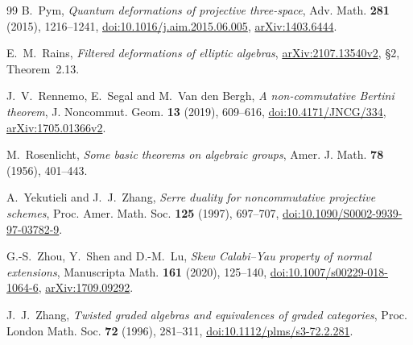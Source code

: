 \documentclass[11pt,a4paper]{ltjsarticle}
\numberwithin{equation}{section}
\begin{document}
\begin{thebibliography}{99}
B.~Pym,
\textit{Quantum deformations of projective three-space},
Adv. Math. \textbf{281} (2015), 1216--1241,
\href{https://doi.org/10.1016/j.aim.2015.06.005}{doi:10.1016/j.aim.2015.06.005},
\href{https://arxiv.org/abs/1403.6444}{arXiv:1403.6444}.

E.~M.~Rains,
\textit{Filtered deformations of elliptic algebras},
\href{https://arxiv.org/abs/2107.13540}{arXiv:2107.13540v2},
\S2, Theorem~2.13.

J.~V.~Rennemo, E.~Segal and M.~Van den Bergh,
\textit{A non-commutative Bertini theorem},
J. Noncommut. Geom. \textbf{13} (2019), 609--616,
\href{https://doi.org/10.4171/JNCG/334}{doi:10.4171/JNCG/334},
\href{https://arxiv.org/abs/1705.01366}{arXiv:1705.01366v2}.

M.~Rosenlicht,
\textit{Some basic theorems on algebraic groups},
Amer. J. Math. \textbf{78} (1956), 401--443.

A.~Yekutieli and J.~J.~Zhang,
\textit{Serre duality for noncommutative projective schemes},
Proc. Amer. Math. Soc. \textbf{125} (1997), 697--707,
\href{https://doi.org/10.1090/S0002-9939-97-03782-9}{doi:10.1090/S0002-9939-97-03782-9}.

G.-S.~Zhou, Y.~Shen and D.-M.~Lu,
\textit{Skew Calabi--Yau property of normal extensions},
Manuscripta Math. \textbf{161} (2020), 125--140,
\href{https://doi.org/10.1007/s00229-018-1064-6}{doi:10.1007/s00229-018-1064-6},
\href{https://arxiv.org/abs/1709.09292}{arXiv:1709.09292}.

J.~J.~Zhang,
\textit{Twisted graded algebras and equivalences of graded categories},
Proc. London Math. Soc. \textbf{72} (1996), 281--311,
\href{https://doi.org/10.1112/plms/s3-72.2.281}{doi:10.1112/plms/s3-72.2.281}.
\end{thebibliography}
\end{document}

